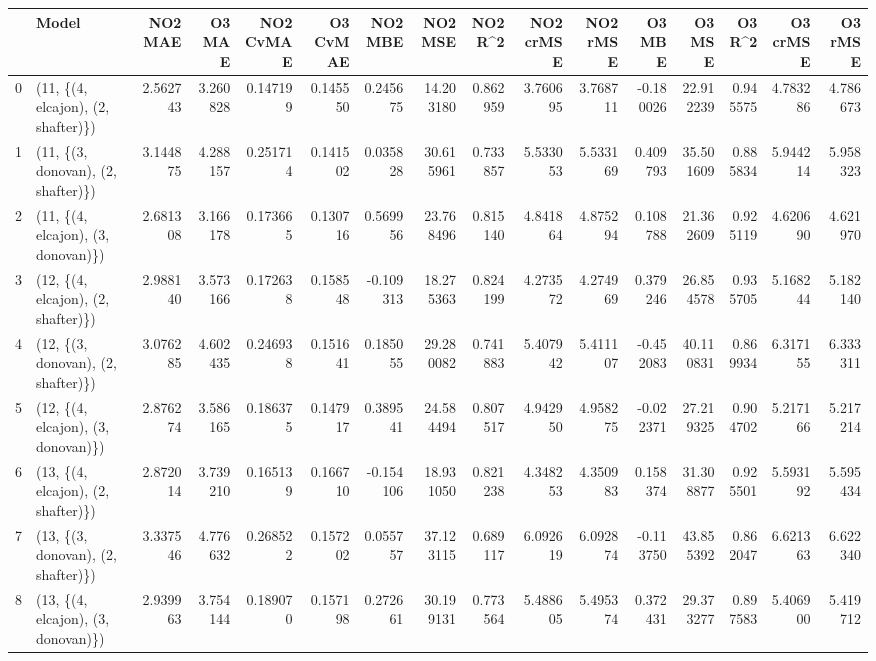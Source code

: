 \begin{tabular}{llrrrrrrrrrrrrrr}
\toprule
{} &                               Model &   NO2 MAE &    O3 MAE &  NO2 CvMAE &  O3 CvMAE &   NO2 MBE &    NO2 MSE &   NO2 R\textasciicircum2 &  NO2 crMSE &  NO2 rMSE &    O3 MBE &     O3 MSE &    O3 R\textasciicircum2 &  O3 crMSE &   O3 rMSE \\
\midrule
0  &  (11, \{(4, elcajon), (2, shafter)\}) &  2.562743 &  3.260828 &   0.147199 &  0.145550 &  0.245675 &  14.203180 &  0.862959 &   3.760695 &  3.768711 & -0.180026 &  22.912239 &  0.945575 &  4.783286 &  4.786673 \\
1  &  (11, \{(3, donovan), (2, shafter)\}) &  3.144875 &  4.288157 &   0.251714 &  0.141502 &  0.035828 &  30.615961 &  0.733857 &   5.533053 &  5.533169 &  0.409793 &  35.501609 &  0.885834 &  5.944214 &  5.958323 \\
2  &  (11, \{(4, elcajon), (3, donovan)\}) &  2.681308 &  3.166178 &   0.173665 &  0.130716 &  0.569956 &  23.768496 &  0.815140 &   4.841864 &  4.875294 &  0.108788 &  21.362609 &  0.925119 &  4.620690 &  4.621970 \\
3  &  (12, \{(4, elcajon), (2, shafter)\}) &  2.988140 &  3.573166 &   0.172638 &  0.158548 & -0.109313 &  18.275363 &  0.824199 &   4.273572 &  4.274969 &  0.379246 &  26.854578 &  0.935705 &  5.168244 &  5.182140 \\
4  &  (12, \{(3, donovan), (2, shafter)\}) &  3.076285 &  4.602435 &   0.246938 &  0.151641 &  0.185055 &  29.280082 &  0.741883 &   5.407942 &  5.411107 & -0.452083 &  40.110831 &  0.869934 &  6.317155 &  6.333311 \\
5  &  (12, \{(4, elcajon), (3, donovan)\}) &  2.876274 &  3.586165 &   0.186375 &  0.147917 &  0.389541 &  24.584494 &  0.807517 &   4.942950 &  4.958275 & -0.022371 &  27.219325 &  0.904702 &  5.217166 &  5.217214 \\
6  &  (13, \{(4, elcajon), (2, shafter)\}) &  2.872014 &  3.739210 &   0.165139 &  0.166710 & -0.154106 &  18.931050 &  0.821238 &   4.348253 &  4.350983 &  0.158374 &  31.308877 &  0.925501 &  5.593192 &  5.595434 \\
7  &  (13, \{(3, donovan), (2, shafter)\}) &  3.337546 &  4.776632 &   0.268522 &  0.157202 &  0.055757 &  37.123115 &  0.689117 &   6.092619 &  6.092874 & -0.113750 &  43.855392 &  0.862047 &  6.621363 &  6.622340 \\
8  &  (13, \{(4, elcajon), (3, donovan)\}) &  2.939963 &  3.754144 &   0.189070 &  0.157198 &  0.272661 &  30.199131 &  0.773564 &   5.488605 &  5.495374 &  0.372431 &  29.373277 &  0.897583 &  5.406900 &  5.419712 \\

\end{tabular}
